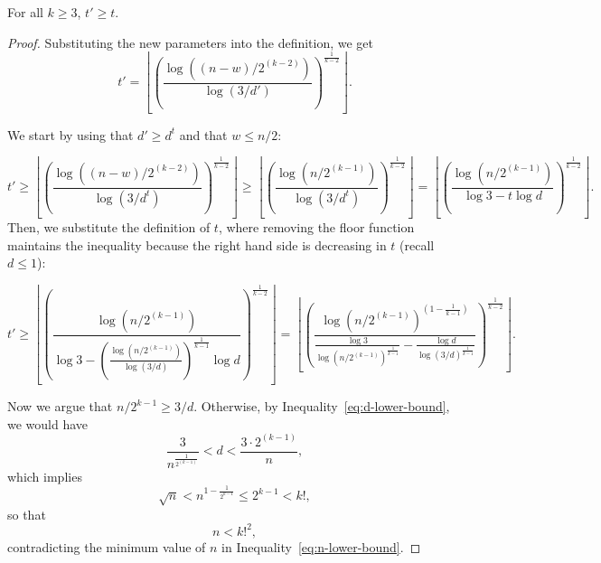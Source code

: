 \newpage
\begin{lemma}\label{lm:t_prime}
    For all $k \geq 3$, $t' \geq t$.

    \begin{proof}

        Substituting the new parameters into the definition, we get
        \[
            t' = \left\lfloor \left(\frac{\log \left((n-w)/2^{(k-2)}\right)}{\log (3/d')} \right)^
            {\frac{1}{k-2}} \right\rfloor.
        \]

        We start by using that $d' \geq d^t$ and that $w \leq n/2$:

        \[
            t' \geq
            \left\lfloor \left(  \frac{\log \left((n-w)/2^{(k-2)}\right)}{\log (3/d^t)} \right)^
            {\frac{1}{k-2}} \right\rfloor \geq
            \left\lfloor \left(  \frac{\log \left(n/2^{(k-1)}\right)}{\log (3/d^t)} \right)^{\frac{1}{k-2}} \right\rfloor =
            \left\lfloor \left(  \frac{\log \left(n / 2^{(k-1)}\right)}{\log 3 - t \log d} \right)^
            {\frac{1}{k-2}} \right\rfloor.
        \]
        Then, we substitute the definition of $t$, where removing the floor function
        maintains the inequality because the right hand side is decreasing in $t$ (recall $d \leq 1$):

        \begin{equation} \label{eq:t_prime}
            t' \geq
            \left\lfloor \left(  \frac{\log \left(n / 2^{(k-1)}\right)}
            {\log 3 - \left(  \frac{\log \left(n / 2^{(k-1)}\right)}{\log (3/d)} \right)^{\frac{1}{k-1}}  \log d} \right)^
            {\frac{1}{k-2}} \right\rfloor
            =
            \left\lfloor \left(  \frac{\log \left(n / 2^{(k-1)}\right)^{\left(1-\frac{1}{k-1}\right)}}
            {\frac{\log 3}{\log\left(n / 2^{(k-1)}\right)^{\frac{1}{k-1}}} - \frac{\log d}{\log (3/d)^{\frac{1}{k-1}}} }
            \right)^{\frac{1}{k-2}} \right\rfloor.
        \end{equation}

        Now we argue that $n/2^{k-1} \geq 3/d$.
        Otherwise, by Inequality~\eqref{eq:d-lower-bound}, we would have
        \[
            \frac{3}{n^{\frac{1}{2^{(k-1)}}}} < d < \frac{3 \cdot 2^{(k-1)}}{n},
        \]
        which implies
        \[
            \sqrt{n} < n^{1 - \frac{1}{2^{k-1}}} \leq 2^{k-1} < k!,
        \]
        so that
        \[
            n < k!^2,
        \]
        contradicting the minimum value of $n$ in Inequality~\eqref{eq:n-lower-bound}.


\end{proof}
\end{lemma}

